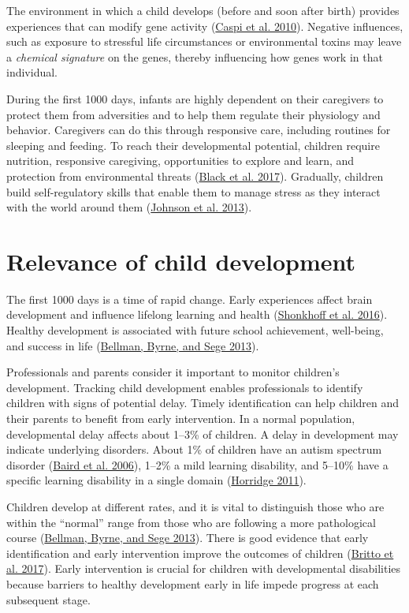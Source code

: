 \documentclass[
]{book}
\begin{document}
The environment in which a child develops (before and soon after birth) provides experiences that can modify gene activity (\protect\hyperlink{ref-caspi2010genetic}{Caspi et al. 2010}). Negative influences, such as exposure to stressful life circumstances or environmental toxins may leave a \emph{chemical signature} on the genes, thereby influencing how genes work in that individual.

During the first 1000 days, infants are highly dependent on their caregivers to protect them from adversities and to help them regulate their physiology and behavior. Caregivers can do this through responsive care, including routines for sleeping and feeding. To reach their developmental potential, children require nutrition, responsive caregiving, opportunities to explore and learn, and protection from environmental threats (\protect\hyperlink{ref-black2017}{Black et al. 2017}). Gradually, children build self-regulatory skills that enable them to manage stress as they interact with the world around them (\protect\hyperlink{ref-johnson2013science}{Johnson et al. 2013}).

\hypertarget{sec:relevance}{%
\section{Relevance of child development}\label{sec:relevance}}

The first 1000 days is a time of rapid change. Early experiences affect brain development and influence lifelong learning and health (\protect\hyperlink{ref-skonkhoff2016best}{Shonkhoff et al. 2016}). Healthy development is associated with future school achievement, well-being, and success in life (\protect\hyperlink{ref-bellman2013}{Bellman, Byrne, and Sege 2013}).

Professionals and parents consider it important to monitor children's development. Tracking child development enables professionals to identify children with signs of potential delay. Timely identification can help children and their parents to benefit from early intervention. In a normal population, developmental delay affects about 1--3\% of children. A delay in development may indicate underlying disorders. About 1\% of children have an autism spectrum disorder (\protect\hyperlink{ref-baird2006}{Baird et al. 2006}), 1--2\% a mild learning disability, and 5--10\% have a specific learning disability in a single domain (\protect\hyperlink{ref-horridge2011}{Horridge 2011}).

Children develop at different rates, and it is vital to distinguish those who are within the ``normal'' range from those who are following a more pathological course (\protect\hyperlink{ref-bellman2013}{Bellman, Byrne, and Sege 2013}). There is good evidence that early identification and early intervention improve the outcomes of children (\protect\hyperlink{ref-britto2017}{Britto et al. 2017}). Early intervention is crucial for children with developmental disabilities because barriers to healthy development early in life impede progress at each subsequent stage.
\end{document}
